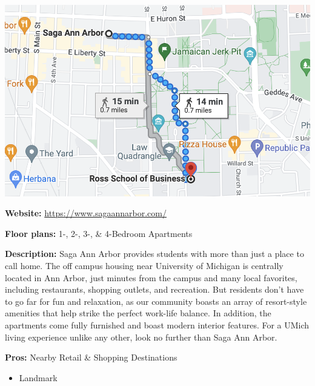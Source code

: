 \documentclass[
]{book}
\providecommand{\tightlist}{%
  \setlength{\itemsep}{0pt}\setlength{\parskip}{0pt}}
\begin{document}
\begin{center}\includegraphics{saga map} \end{center}

\textbf{Website:}
\url{https://www.sagaannarbor.com/}

\textbf{Floor plans:}
1-, 2-, 3-, \& 4-Bedroom Apartments

\textbf{Description:}
Saga Ann Arbor provides students with more than just a place to call home. The off campus housing near University of Michigan is centrally located in Ann Arbor, just minutes from the campus and many local favorites, including restaurants, shopping outlets, and recreation. But residents don't have to go far for fun and relaxation, as our community boasts an array of resort-style amenities that help strike the perfect work-life balance. In addition, the apartments come fully furnished and boast modern interior features. For a UMich living experience unlike any other, look no further than Saga Ann Arbor.

\textbf{Pros:}
Nearby Retail \& Shopping Destinations

\begin{itemize}
\tightlist
\item
  Landmark
\end{itemize}
\end{document}
